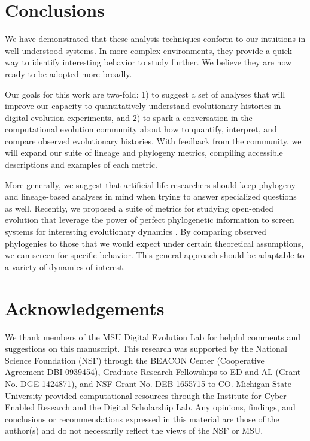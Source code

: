 \documentclass[letterpaper]{article}
\begin{document}
\section{Conclusions}


We have demonstrated that these analysis techniques conform to our intuitions in well-understood systems. In more complex environments, they provide a quick way to identify interesting behavior to study further. We believe they are now ready to be adopted more broadly.

Our goals for this work are two-fold: 1) to suggest a set of analyses that will improve our capacity to quantitatively understand evolutionary histories in digital evolution experiments, and 2) to spark a conversation in the computational evolution community about how to quantify, interpret, and compare observed evolutionary histories. With feedback from the community, we will expand our suite of lineage and phylogeny metrics, compiling accessible descriptions and examples of each metric. 

More generally, we suggest that artificial life researchers should keep phylogeny- and lineage-based analyses in mind when trying to answer specialized questions as well. Recently, we proposed a suite of metrics for studying open-ended evolution that leverage the power of perfect phylogenetic information to screen systems for interesting evolutionary dynamics \citep{dolson_modes_2018}. By comparing observed phylogenies to those that we would expect under certain theoretical assumptions, we can screen for specific behavior. This general approach should be adaptable to a variety of dynamics of interest.

\section{Acknowledgements}

We thank members of the MSU Digital Evolution Lab for helpful comments and suggestions on this manuscript. This research was supported by the National Science Foundation (NSF) through the BEACON Center (Cooperative Agreement DBI-0939454), Graduate Research Fellowships to ED and AL (Grant No. DGE-1424871), and NSF Grant No. DEB-1655715 to CO. Michigan State University provided computational resources through the Institute for Cyber-Enabled Research and the Digital Scholarship Lab. Any opinions, findings, and conclusions or recommendations expressed in this material are those of the author(s) and do not necessarily reflect the views of the NSF or MSU.

\setlength{\bibsep}{2pt}

\footnotesize


\end{document}
